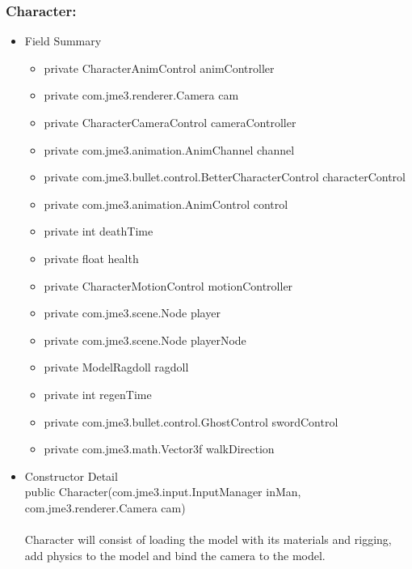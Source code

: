 \documentclass[letterpaper]{article}
\begin{document}
						\vspace{0.2in}
						\subsubsection*{Character:}
						\vspace{0.1in}
							\begin{itemize}
								\item	Field Summary
										\begin{itemize}
											\item	private CharacterAnimControl	animController 
											\item	private com.jme3.renderer.Camera	cam 
											\item	private CharacterCameraControl	cameraController 
											\item	private com.jme3.animation.AnimChannel	channel 
											\item	private com.jme3.bullet.control.BetterCharacterControl	characterControl 
											\item	private com.jme3.animation.AnimControl	control 
											\item	private int	deathTime 
											\item	private float	health 
											\item	private CharacterMotionControl	motionController 
											\item	private com.jme3.scene.Node	player 
											\item	private com.jme3.scene.Node	playerNode 
											\item	private ModelRagdoll	ragdoll 
											\item	private int	regenTime 
											\item	private com.jme3.bullet.control.GhostControl	swordControl 
											\item	private com.jme3.math.Vector3f	walkDirection  
										\end{itemize}
								\item	Constructor Detail \\
										public Character(com.jme3.input.InputManager inMan, \\
		        com.jme3.renderer.Camera cam) \\ \\
										Character will consist of loading the model with its materials and rigging, add physics to the model and bind the camera to the model. \\ \\

\end{itemize}
\end{document}
